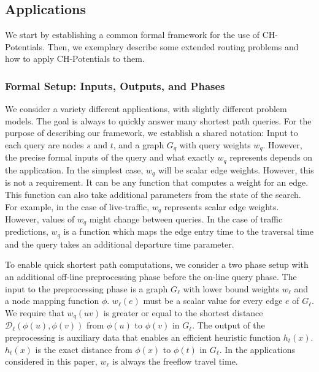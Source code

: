 \documentclass[manuscript,review]{acmart}
\newcommand*{\dist}{\mathcal{D}}
\begin{document}
\subsection{Applications}\label{sec:extensions}

We start by establishing a common formal framework for the use of CH-Potentials.
Then, we exemplary describe some extended routing problems and how to apply CH-Potentials to them.

\subsubsection{Formal Setup: Inputs, Outputs, and Phases}

We consider a variety different applications, with slightly different problem models.
The goal is always to quickly answer many shortest path queries.
For the purpose of describing our framework, we establish a shared notation:
Input to each query are nodes $s$ and $t$, and a graph $G_q$ with query weights $w_q$.
However, the precise formal inputs of the query and what exactly $w_q$ represents depends on the application.
In the simplest case, $w_q$ will be scalar edge weights.
However, this is not a requirement.
It can be any function that computes a weight for an edge.
This function can also take additional parameters from the state of the search.
For example, in the case of live-traffic, $w_q$ represents scalar edge weights.
However, values of $w_q$ might change between queries.
In the case of traffic predictions, $w_q$ is a function which maps the edge entry time to the traversal time and the query takes an additional departure time parameter.

To enable quick shortest path computations, we consider a two phase setup with an additional off-line preprocessing phase before the on-line query phase.
The input to the preprocessing phase is a graph $G_\ell$ with lower bound weights $w_\ell$ and a node mapping function $\phi$.
$w_\ell(e)$ must be a scalar value for every edge $e$ of $G_\ell$.
We require that $w_q(u v)$ is greater or equal to the shortest distance $\dist_\ell(\phi(u), \phi(v))$ from $\phi(u)$ to $\phi(v)$ in $G_\ell$. %
The output of the preprocessing is auxiliary data that enables an efficient heuristic function $h_t(x)$.
$h_t(x)$ is the exact distance from $\phi(x)$ to $\phi(t)$ in $G_\ell$.
In the applications considered in this paper, $w_\ell$ is always the freeflow travel time.
\end{document}

